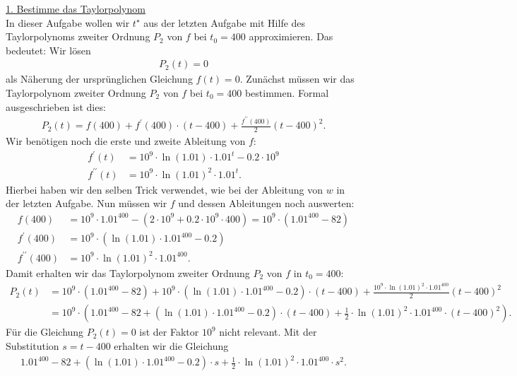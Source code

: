 \underline{1. Bestimme das Taylorpolynom}\\
In dieser Aufgabe wollen wir $ t^\star $ aus der letzten Aufgabe mit Hilfe des Taylorpolynoms zweiter Ordnung $ P_2 $ von $ f $ bei $ t_0 = 400 $ approximieren.
Das bedeutet: Wir lösen 
\begin{align*}
	P_2(t) = 0
\end{align*}
als Näherung der ursprünglichen Gleichung $ f(t) = 0 $. Zunächst müssen wir das Taylorpolynom zweiter Ordnung $ P_2 $ von $ f $ bei $ t_0 = 400 $ bestimmen.
Formal ausgeschrieben ist dies:
\begin{align*}
	P_2(t)
	=
	f(400) + f^\prime(400) \cdot (t -400) + \frac{f^{\prime \prime }(400)}{2}(t -400)^2. 
\end{align*}
Wir benötigen noch die erste und zweite Ableitung von $ f $:
\begin{align*}
	f^\prime(t) &= 10^9 \cdot  \ln(1.01) \cdot 1.01^t - 0.2\cdot 10^9\\
	f^{\prime \prime}(t) &= 10^9 \cdot \ln(1.01)^2 \cdot 1.01^t.
\end{align*}
Hierbei haben wir den selben Trick verwendet, wie bei der Ableitung von $ w $ in der letzten Aufgabe. Nun müssen wir $ f $ und dessen Ableitungen noch auswerten:
\begin{align*}
	f(400) &= 10^9 \cdot 1.01^{400} - (2 \cdot 10^9 + 0.2 \cdot 10^9 \cdot 400)
	= 10^9 \cdot (1.01^{400} - 82)\\
	f^\prime(400)
	&=
	10^9 \cdot (\ln(1.01) \cdot  1.01^{400}- 0.2)\\
	f^{\prime \prime}(400)
	&=
	10^9 \cdot  \ln(1.01)^2 \cdot 1.01^{400}.
\end{align*}
Damit erhalten wir das Taylorpolynom zweiter Ordnung $ P_2 $ von $ f $ in $ t_0 = 400 $:
\begin{align*}
	P_2(t)
	&=
	10^9 \cdot (1.01^{400} - 82) + 10^9 \cdot (\ln(1.01) \cdot  1.01^{400}- 0.2) \cdot (t -400) + \frac{10^9 \cdot  \ln(1.01)^2 \cdot 1.01^{400}}{2}(t -400)^2\\
	&=
	10^9 \cdot 
	\left(
	1.01^{400} - 82 + (\ln(1.01) \cdot  1.01^{400}- 0.2) \cdot (t -400)
	+
	\frac{1}{2} \cdot  \ln(1.01)^2 \cdot 1.01^{400}  \cdot (t -400)^2
	\right).
\end{align*}
Für die Gleichung $ P_2(t) = 0  $ ist der Faktor $ 10^9  $ nicht relevant. Mit der Substitution $  s = t - 400 $ erhalten wir die Gleichung
\begin{align*}
	1.01^{400} - 82 + (\ln(1.01) \cdot  1.01^{400}- 0.2) \cdot s
	+
	\frac{1}{2} \cdot  \ln(1.01)^2 \cdot 1.01^{400}  \cdot s^2.
\end{align*}
